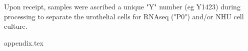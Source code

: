 \documentclass[a4paper, 12pt]{report}
\begin{document}
Upon receipt, samples were ascribed a unique "Y" number (eg Y1423) during processing to separate the urothelial cells for RNAseq ("P0") and/or NHU cell culture.

{appendix.tex}







\end{document}
